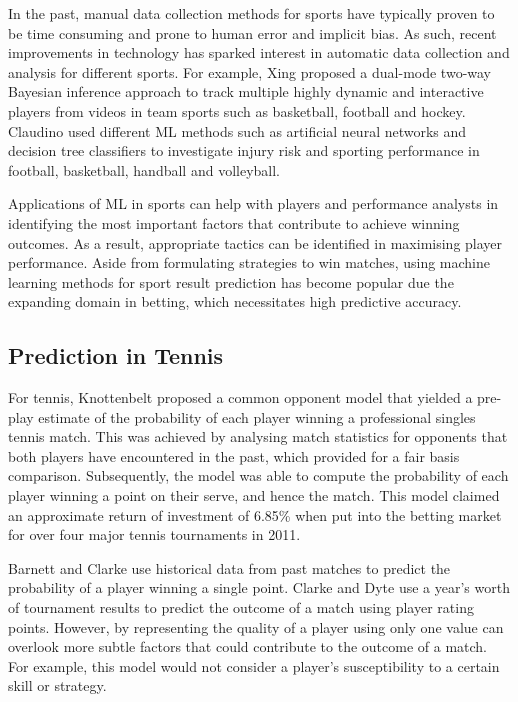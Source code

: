 In the past, manual data collection methods for sports have typically proven to be time consuming and prone to human error and implicit bias. As such, recent improvements in technology has sparked interest in automatic data collection and analysis for different sports.
For example, Xing \etal \cite{xing2010multiple} proposed a dual-mode two-way Bayesian inference approach to track multiple highly dynamic and interactive players from videos in team sports such as basketball, football and hockey. Claudino \etal \cite{claudino2019current} used different ML methods such as artificial neural networks and decision tree classifiers to investigate injury risk and sporting performance in football, basketball, handball and volleyball.

Applications of ML in sports can help with players and performance analysts in identifying the most important factors that contribute to achieve winning outcomes. As a result, appropriate tactics can be identified in maximising player performance.
Aside from formulating strategies to win matches, using machine learning methods for sport result prediction has become popular due the expanding domain in betting, which necessitates high predictive accuracy.




\subsection{Prediction in Tennis}
For tennis, Knottenbelt \etal \cite{knottenbelt2012common} proposed a common opponent model that yielded a pre-play estimate of the probability of each player winning a professional singles tennis match. This was achieved by analysing match statistics for opponents that both players have encountered in the past, which provided for a fair basis comparison. Subsequently, the model was able to compute the probability of each player winning a point on their serve, and hence the match. This model claimed an approximate return of investment of 6.85\% when put into the betting market for over four major tennis tournaments in 2011.

Barnett and Clarke \cite{barnett2005combining} use historical data from past matches to predict the probability of a player winning a single point. Clarke and Dyte \cite{clarke2000using} use a year's worth of tournament results to predict the outcome of a match using player rating points.
However, by representing the quality of a player using only one value can overlook more subtle factors that could contribute to the outcome of a match. For example, this model would not consider a player's susceptibility to a certain skill or strategy.

